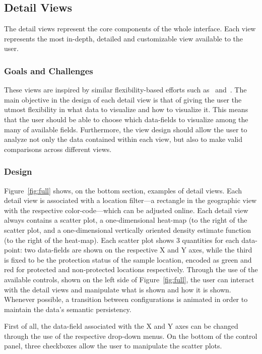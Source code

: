 \documentclass[letterpaper]{article} %
\begin{document}
\subsection{Detail Views}

The detail views represent the core components of the whole interface.  Each
view represents the most in-depth, detailed and customizable view available to
the user.

\subsubsection{Goals and Challenges}  

These views are inspired by similar flexibility-based efforts such as~\cite{detailtooverview} and~\cite{glostix}.  The main objective in the design
of each detail view is that of giving the user the utmost flexibility in what
data to visualize and how to visualize it.  This means that the user should be
able to choose which data-fields to visualize among the many of available
fields.  Furthermore, the view design should allow the user to analyze not only
the data contained within each view, but also to make valid comparisons across
different views.

\subsubsection{Design}

Figure~\ref{fig:full} shows, on the bottom section, examples of detail views.
Each detail view is associated with a location filter---a rectangle in the
geographic view with the respective color-code---which can be adjusted online.
Each detail view always contains a scatter plot, a one-dimensional heat-map (to
  the right of the scatter plot, and a one-dimensional vertically oriented
  density estimate function (to the right of the heat-map).  Each scatter plot
  shows 3 quantities for each data-point:  two data-fields are shown on the
  respective X and Y axes, while the third is fixed to be the protection status
  of the sample location, encoded as green and red for protected and
  non-protected locations respectively.  Through the use of the available
  controls, shown on the left side of Figure~\ref{fig:full}, the user can
  interact with the detail views and manipulate what is shown and how it is
  shown.  Whenever possible, a transition between configurations is animated in
  order to maintain the data's semantic persistency.

First of all, the data-field associated with the X and Y axes can be changed
through the use of the respective drop-down menus.  On the bottom of the
control panel, three checkboxes allow the user to manipulate the scatter plots.
\end{document}
